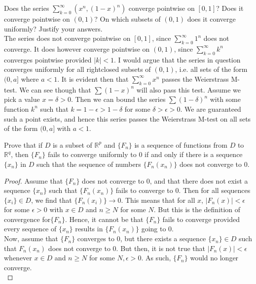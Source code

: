 \documentclass[12pt]{book}
\newcommand{\R}{\mathbb{R}}
\newenvironment{exercise}[2][Exercise]{\begin{trivlist}
\item[\hskip \labelsep {\bfseries #1}\hskip \labelsep {\bfseries #2.}]}{\end{trivlist}}
\begin{document}
\begin{exercise}{7.2.7}
\begin{exercise}{8.3.10}
Does the series $\sum_{k=0}^\infty \left( x^n, (1-x)^n \right)$ converge pointwise on $[0,1]$? Does it converge pointwise on $(0,1)$? On which subsets of $(0,1)$ does it converge uniformly? Justify your answers. \\

The series does not converge pointwise on $[0,1]$, since $\sum_{k=0}^\infty 1^n$ does not converge. It does however converge pointwise on $(0,1)$, since $\sum_{k=0}^\infty k^n$ converges pointwise provided $|k| < 1$. I would argue that the series in question converges uniformly for all rightclosed subsets of $(0,1)$, i.e. all sets of the form $(0,a]$ where $a<1$. It is evident then that $\sum_{k=0}^\infty x^n$ passes the Weierstrass M-test. We can see though that $\sum (1-x)^n$ will also pass this test. Assume we pick a value $x = \delta>0$. Then we can bound the series $\sum (1- \delta)^n$ with some function $k^n$ such that $k = 1 - \epsilon > 1 - \delta$ for some $\delta > \epsilon > 0$. We are guaranteed such a point exists, and hence this series passes the Weierstrass M-test on all sets of the form $(0,a]$ with $a<1$.
\end{exercise}




\begin{exercise}{8.3.12}
Prove that if $D$ is a subset of $\R^p$ and $\{ F_n\}$ is a sequence of functions from $D$ to $\R^q$, then $\{F_n\}$ fails to converge uniformly to 0 if and only if there is a sequence $\{x_n\}$ in $D$ such that the sequence of numbers $\{ F_n (x_n) \}$ does not converge to 0.

\begin{proof}
    Assume that $\{F_n\}$ does not converge to 0, and that there does not exist a sequence $\{x_n\}$ such that $\{F_n(x_n)\}$ fails to converge to 0. Then for all sequences $\{x_i\} \in D$, we find that $\{F_n ( x_i)\} \to 0$. This means that for all $x$, $\left| F_n (x) \right| < \epsilon$ for some $\epsilon >0$  with $x \in D$ and $n \geq N$ for some $N$. But this is the definition of convergence for$\{F_n\}$. Hence, it cannot be that $\{F_n\}$ fails to converge provided every sequence of $\{x_n\}$ results in $\{F_n (x_n)\}$ going to 0. \\

    Now, assume that $\{F_n\}$ converges to 0, but there exists a sequence $\{x_n\} \in D$ such that $F_n(x_n)$ does not converge to 0. But then, it is not true that $|F_n(x)|< \epsilon$ whenever $x \in D$ and $n \geq N$ for some $N, \epsilon>0$. As such, $\{F_n\}$ would no longer converge. \\


\end{proof}
\end{exercise}
\end{exercise}
\end{document}
